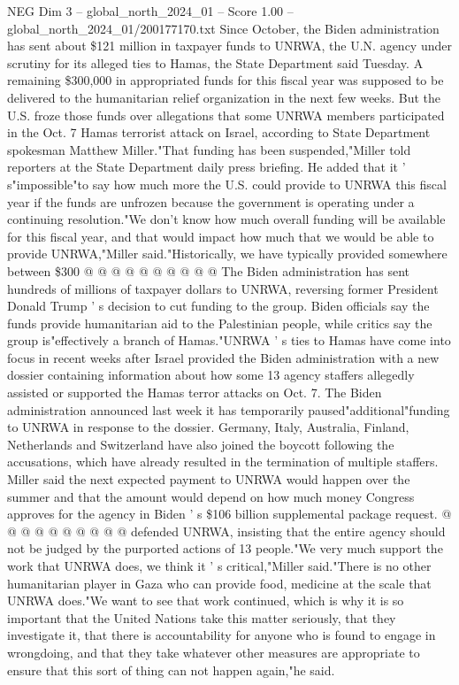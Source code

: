 \begin{textsample}{NEG Dim 3 – global\_north\_2024\_01 – Score 1.00 – global\_north\_2024\_01/200177170.txt}  \label{ex:f3_neg_233}
Since October, the Biden administration has sent about \$121 million in taxpayer funds to UNRWA, the U.N. agency under scrutiny for its alleged ties to Hamas, the State Department said Tuesday.
A remaining \$300,000 in appropriated funds for this fiscal year was supposed to be delivered to the humanitarian relief organization in the next few weeks.
But the U.S. froze those funds over allegations that some UNRWA members participated in the Oct. 7 Hamas terrorist attack on Israel, according to State Department spokesman Matthew Miller."That funding has been suspended,"Miller told reporters at the State Department daily press briefing.
He added that it ' s"impossible"to say how much more the U.S. could provide to UNRWA this fiscal year if the funds are unfrozen because the government is operating under a continuing resolution."We don't know how much overall funding will be available for this fiscal year, and that would impact how much that we would be able to provide UNRWA,"Miller said."Historically, we have typically provided somewhere between \$300 @ @ @ @ @ @ @ @ @ @ The Biden administration has sent hundreds of millions of taxpayer dollars to UNRWA, reversing former President Donald Trump ' s decision to cut funding to the group.
Biden officials say the funds provide humanitarian aid to the Palestinian people, while critics say the group is"effectively a branch of Hamas."UNRWA ' s ties to Hamas have come into focus in recent weeks after Israel provided the Biden administration with a new dossier containing information about how some 13 agency staffers allegedly assisted or supported the Hamas terror attacks on Oct. 7.
The Biden administration announced last week it has temporarily paused"additional"funding to UNRWA in response to the dossier.
Germany, Italy, Australia, Finland, Netherlands and Switzerland have also joined the boycott following the accusations, which have already resulted in the termination of multiple staffers.
Miller said the next expected payment to UNRWA would happen over the summer and that the amount would depend on how much money Congress approves for the agency in Biden ' s \$106 billion supplemental package request. @ @ @ @ @ @ @ @ @ @ defended UNRWA, insisting that the entire agency should not be judged by the purported actions of 13 people."We very much support the work that UNRWA does, we think it ' s critical,"Miller said."There is no other humanitarian player in Gaza who can provide food, medicine at the scale that UNRWA does."We want to see that work continued, which is why it is so important that the United Nations take this matter seriously, that they investigate it, that there is accountability for anyone who is found to engage in wrongdoing, and that they take whatever other measures are appropriate to ensure that this sort of thing can not happen again,"he said.

\end{textsample}
